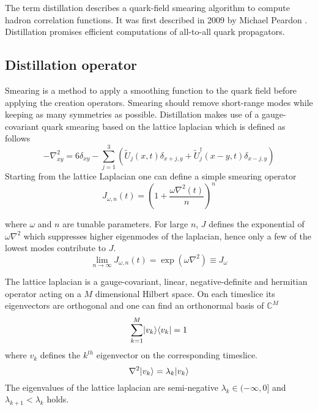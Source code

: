 	
The term distillation describes a quark-field smearing algorithm to compute hadron correlation functions. It was first described in 2009 by Michael Peardon \cite{distillation_paper}. Distillation promises efficient computations of all-to-all quark propagators.

\subsection{Distillation operator}
    Smearing is a method to apply a smoothing function to the quark field before applying the creation operators. Smearing should remove short-range modes while keeping as many symmetries as possible. Distillation makes use of a gauge-covariant quark smearing based on the lattice laplacian which is defined as follows
	\begin{equation}
	    -\nabla^2_{xy} = 6\delta_{xy} - \sum^3_{j=1}(\tilde{U}_j(x,t)\delta_{x+j,y} + \tilde{U}^\dagger_j(x-y,t)\delta_{x-j,y})
	\end{equation}
	\noindent
	Starting from the lattice Laplacian one can define a simple smearing operator
	\begin{equation}
	    J_{\omega,n}(t) = (1+\frac{\omega\nabla^2(t)}{n})^n
	\end{equation}
	
	\noindent
	where $\omega$ and $n$ are tunable parameters. For large $n$, $J$ defines the exponential of $\omega\nabla^2$ which suppresses higher eigenmodes of the laplacian, hence only a few of the lowest modes contribute to $J$.
	\begin{equation}
        \lim_{n\rightarrow\infty} J_{\omega,n}(t) = \exp(\omega\nabla^2) \equiv J_\omega
	\end{equation}
	
	\noindent
    The lattice laplacian is a gauge-covariant, linear, negative-definite and hermitian operator acting on a $M$ dimensional Hilbert space. On each timeslice its eigenvectors are orthogonal and one can find an orthonormal basis of $\mathbb{C}^M$
    \cite{bachelor_thesis_jan}
    \begin{equation}\label{othonormal_eigenvectors}
        \sum^M_{k=1}\lvert v_k\rangle\langle v_k\rvert = 1
    \end{equation}
    where $v_k$ defines the $k^{th}$ eigenvector on the corresponding timeslice.
    \begin{equation}
        \nabla^2\lvert v_k\rangle = \lambda_k\lvert v_k\rangle
    \end{equation}
    The eigenvalues of the lattice laplacian are semi-negative $\lambda_k \in (-\infty,0]$ and $\lambda_{k+1} < \lambda_k$ holds.\\
    
